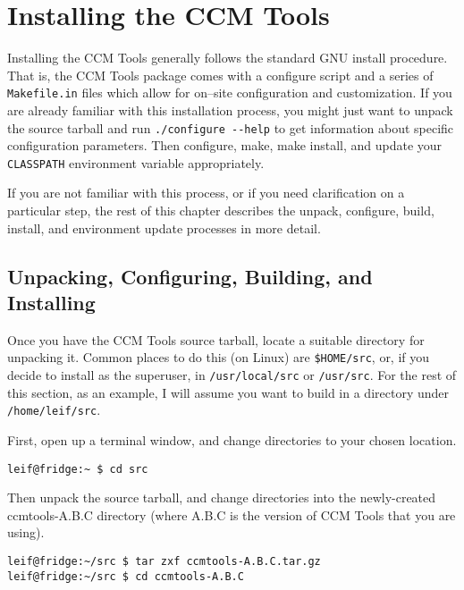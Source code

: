 \chapter{Installing the CCM Tools}

Installing the CCM Tools generally follows the standard GNU install procedure.
That is, the CCM Tools package comes with a configure script and a series of
\verb+Makefile.in+ files which allow for on--site configuration and
customization. If you are already familiar with this installation process, you
might just want to unpack the source tarball and run \verb+./configure --help+
to get information about specific configuration parameters. Then configure,
make, make install, and update your \verb+CLASSPATH+ environment variable
appropriately.

If you are not familiar with this process, or if you need clarification on a
particular step, the rest of this chapter describes the unpack, configure,
build, install, and environment update processes in more detail.

\section{Unpacking, Configuring, Building, and Installing}

Once you have the CCM Tools source tarball, locate a suitable directory for
unpacking it. Common places to do this (on Linux) are \verb+$HOME/src+, or, if
you decide to install as the superuser, in \verb+/usr/local/src+ or
\verb+/usr/src+. For the rest of this section, as an example, I will assume you
want to build in a directory under \verb+/home/leif/src+.

First, open up a terminal window, and change directories to your chosen
location.

\begin{verbatim}
leif@fridge:~ $ cd src
\end{verbatim}

Then unpack the source tarball, and change directories into the newly-created
ccmtools-A.B.C directory (where A.B.C is the version of CCM Tools that you are
using).

\begin{verbatim}
leif@fridge:~/src $ tar zxf ccmtools-A.B.C.tar.gz
leif@fridge:~/src $ cd ccmtools-A.B.C
\end{verbatim}

